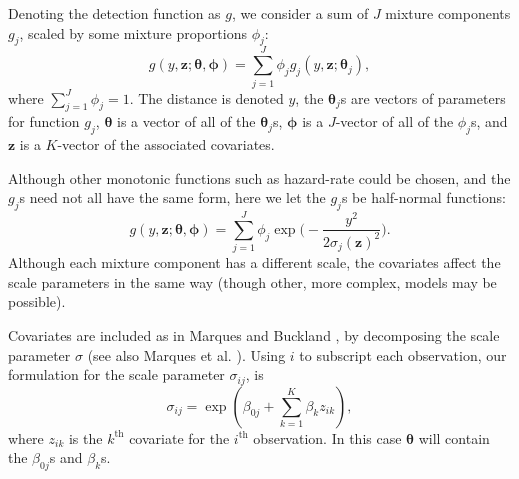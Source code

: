 \documentclass[10pt]{article}
\begin{document}
Denoting the detection function as $g$, we consider a sum of $J$ mixture components $g_j$, scaled by some mixture proportions $\phi_j$:
\begin{equation*}
g(y,\mathbf{z}; \boldsymbol{\theta}, \boldsymbol{\phi}) = \sum_{j=1}^J \phi_j g_j(y,\mathbf{z}; \boldsymbol{\theta}_j),
\end{equation*}
where $\sum_{j=1}^J \phi_j = 1$. The distance is denoted $y$, the $\boldsymbol{\theta}_j$s are vectors of parameters for function $g_j$, $\boldsymbol{\theta}$ is a vector of all of the $\boldsymbol{\theta}_j$s, $\boldsymbol{\phi}$ is a $J$-vector of all of the $\phi_j$s, and $\mathbf{z}$ is a $K$-vector of the associated covariates.  

Although other monotonic functions such as hazard-rate could be chosen, and the $g_j$s need not all have the same form, here we let the $g_j$s be half-normal functions:
\begin{equation*}
g(y,\mathbf{z}; \boldsymbol{\theta}, \boldsymbol{\phi}) = \sum_{j=1}^J \phi_j \exp \Big( - \frac{y^2}{2\sigma_j(\mathbf{z})^2} \Big).
\end{equation*}
Although each mixture component has a different scale, the covariates affect the scale parameters in the same way (though other, more complex, models may be possible).

Covariates are included as in Marques and Buckland \cite{Marques:2003vb}, by decomposing the scale parameter $\sigma$ (see also Marques et al. \cite{Marques:2007vm}).  Using $i$ to subscript each observation, our formulation for the scale parameter $\sigma_{ij}$, is
\begin{equation*}
\sigma_{ij} = \exp( \beta_{0j} + \sum_{k=1}^K \beta_k z_{ik}),
\end{equation*}
where $z_{ik}$ is the $k^\text{th}$ covariate for the $i^\text{th}$ observation. In this case $\boldsymbol{\theta}$ will contain the $\beta_{0j}$s and $\beta_k$s.
\end{document}
